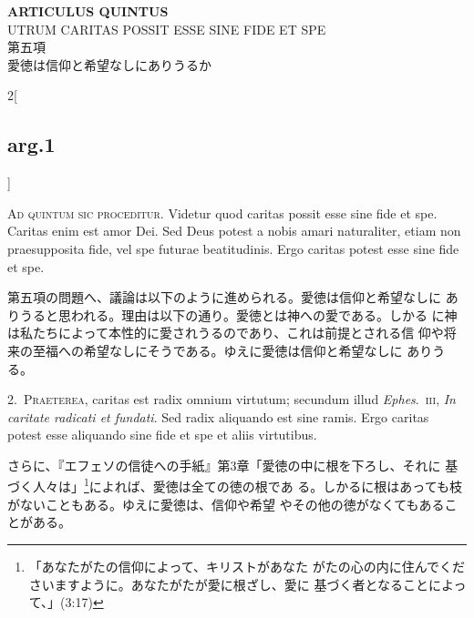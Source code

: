\documentclass[paper=a4paper,fontsize=10pt,jafontsize=9pt,titlepage]{jlreq}
\begin{document}
\begin{center}
{\Large {\bfseries ARTICULUS QUINTUS}}\\
{\large UTRUM CARITAS POSSIT ESSE SINE FIDE ET SPE}\\
{\Large 第五項\\愛徳は信仰と希望なしにありうるか}
\end{center}

\begin{paracol}{2}[\subsection{arg.1}]

{\scshape Ad quintum sic proceditur}. Videtur quod caritas possit esse
sine fide et spe. Caritas enim est amor Dei. Sed Deus potest a nobis
amari naturaliter, etiam non praesupposita fide, vel spe futurae
beatitudinis. Ergo caritas potest esse sine fide et spe.

\switchcolumn

第五項の問題へ、議論は以下のように進められる。愛徳は信仰と希望なしに
 ありうると思われる。理由は以下の通り。愛徳とは神への愛である。しかる
 に神は私たちによって本性的に愛されうるのであり、これは前提とされる信
 仰や将来の至福への希望なしにそうである。ゆえに愛徳は信仰と希望なしに
 ありうる。


2.~{\scshape Praeterea}, caritas est radix omnium virtutum; secundum
illud {\itshape Ephes}.~{\scshape iii}, {\itshape In caritate radicati
et fundati}. Sed radix aliquando est sine ramis. Ergo caritas potest
esse aliquando sine fide et spe et aliis virtutibus.

\switchcolumn

さらに、『エフェソの信徒への手紙』第3章「愛徳の中に根を下ろし、それに
 基づく人々は」\footnote{「あなたがたの信仰によって、キリストがあなた
 がたの心の内に住んでくださいますように。あなたがたが愛に根ざし、愛に
 基づく者となることによって、」(3:17)}によれば、愛徳は全ての徳の根であ
 る。しかるに根はあっても枝がないこともある。ゆえに愛徳は、信仰や希望
 やその他の徳がなくてもあることがある。



\end{paracol}
\end{document}
